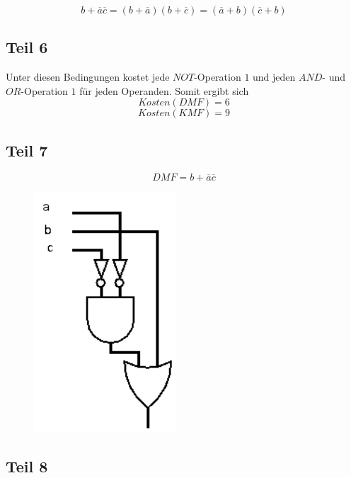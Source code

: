 \documentclass[10pt,a4paper]{article}
\begin{document}
\begin{equation}
b + \overline{a}\overline{c} = (b + \overline{a})(b + \overline{c}) = (\overline{a} + b)(\overline{c} + b)
\end{equation}

\subsection*{Teil 6}

Unter diesen Bedingungen kostet jede $NOT$-Operation $1$ und jeden $AND$- und $OR$-Operation $1$ für jeden Operanden.
Somit ergibt sich
\begin{equation}
Kosten(DMF) = 6
\end{equation}
\begin{equation}
Kosten(KMF) = 9
\end{equation}

\subsection*{Teil 7}

\begin{equation}
DMF = b + \overline{a}\overline{c}
\end{equation}
\begin{figure}[H]
\includegraphics[width=150pt]{9_7}
\end{figure}

\subsection*{Teil 8}
\end{document}
